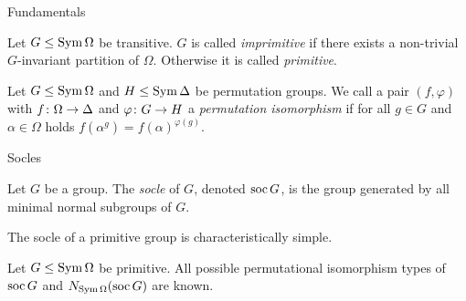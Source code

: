 \begin{frame}{Fundamentals}
    \begin{defn}
        Let $G \leq \operatorname{Sym} \Omega$ be transitive.
        $G$ is called \emph{imprimitive} if there exists a non-trivial
        $G$-invariant partition of $\Omega$.
        Otherwise it is called \emph{primitive}.
    \end{defn}
    \pause

    \begin{defn}
        Let $G \leq \operatorname{Sym} \Omega$ and $H \leq \operatorname{Sym} \Delta$ be permutation groups.
        We call a pair $(f, \varphi)$ with
        $f \colon \Omega \rightarrow \Delta$
        and
        $\varphi \colon G \rightarrow H$
        a \emph{permutation isomorphism}
        if
        \pause
        for all
        $g \in G$ and $\alpha \in \Omega$ holds
        $f(\alpha ^ g) = f(\alpha) ^ {\varphi(g)}$.
    \end{defn}
\end{frame}


\begin{frame}{Socles}
    \begin{defn}
        Let $G$ be a group. The \emph{socle} of $G$, denoted $\operatorname{soc} G$,
        is the group generated by all minimal normal subgroups of $G$.
    \end{defn}
    \pause

    \begin{thm}
        The socle of a primitive group is characteristically simple.
    \end{thm}
    \pause

    \begin{thm}
        Let $G \leq \operatorname{Sym} \Omega$ be primitive.
        All possible permutational isomorphism types of $\operatorname{soc} G$ and
        $N_{\operatorname{Sym} \Omega}(\operatorname{soc} G)$ are known.
    \end{thm}
\end{frame}

